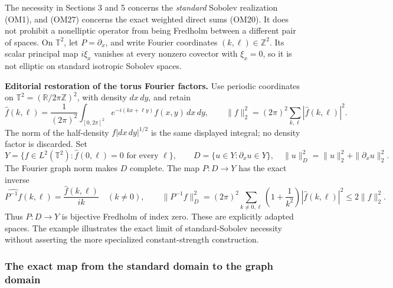 \documentclass[
  11pt,
]{article}
\makeatletter
\let\ReaderOriginalAnchorStart\hyper@anchorstart
\let\ReaderOriginalAnchorEnd\hyper@anchorend
\let\ReaderPendingAliases\@empty
\def\ReaderArmAliases#1{\gdef\ReaderPendingAliases{#1}}
\def\hyper@anchorstart#1{\ReaderIfNativeAnchorTF{#1}{\ReaderPendingAliases\global\let\ReaderPendingAliases\@empty}{}\ReaderOriginalAnchorStart{#1}}
\makeatother
\begin{document}
The necessity in Sections 3 and 5 concerns the \emph{standard} Sobolev
realization (OM1), and (OM27) concerns the exact weighted direct sums
(OM20). It does not prohibit a nonelliptic operator from being Fredholm
between a different pair of spaces. On \(\mathbb T^2\), let
\(P=\partial_x\), and write Fourier coordinates
\((k,\ell)\in\mathbb Z^2\). Its scalar principal map \(i\xi_x\) vanishes
at every nonzero covector with \(\xi_x=0\), so it is not elliptic on
standard isotropic Sobolev spaces.

\textbf{Editorial restoration of the torus Fourier factors.} Use
periodic coordinates on \(\mathbb T^2=(\mathbb R/2\pi\mathbb Z)^2\),
with density \(dx\,dy\), and retain \[
 \widehat f(k,\ell)=\frac1{(2\pi)^2}\int_{[0,2\pi]^2}
 e^{-i(kx+\ell y)}f(x,y)\,dx\,dy,
 \qquad \|f\|_2^2=(2\pi)^2\sum_{k,\ell}|\widehat f(k,\ell)|^2.
 \tag{OM29a}
\] The norm of the half-density \(f|dx\,dy|^{1/2}\) is the same
displayed integral; no density factor is discarded. Set \[
 Y=\{f\in L^2(\mathbb T^2):\widehat f(0,\ell)=0
          \text{ for every }\ell\},\qquad
 D=\{u\in Y:\partial_xu\in Y\},
 \quad \|u\|_D^2=\|u\|_2^2+\|\partial_xu\|_2^2.
 \tag{OM29}
\] The Fourier graph norm makes \(D\) complete. The map \(P:D\to Y\) has
the exact inverse \[
 \widehat{P^{-1}f}(k,\ell)=\frac{\widehat f(k,\ell)}{ik}
 \quad(k\ne0),\qquad
 \|P^{-1}f\|_D^2
 =(2\pi)^2\sum_{k\ne0,\ell}\left(1+\frac1{k^2}\right)
        |\widehat f(k,\ell)|^2\le2\|f\|_2^2.
 \tag{OM30}
\] Thus \(P:D\to Y\) is bijective Fredholm of index zero. These are
explicitly adapted spaces. The example illustrates the exact limit of
standard-Sobolev necessity without asserting the more specialized
constant-strength construction.

\ReaderArmAliases{\ReaderOriginalAnchorStart{the-exact-map-from-the-standard-domain-to-the-graph-domain}\ReaderOriginalAnchorEnd}
\subsubsection{The exact map from the standard domain to the graph
domain}\label{the-exact-map-from-the-standard-domain-to-the-graph-domain}
\end{document}
